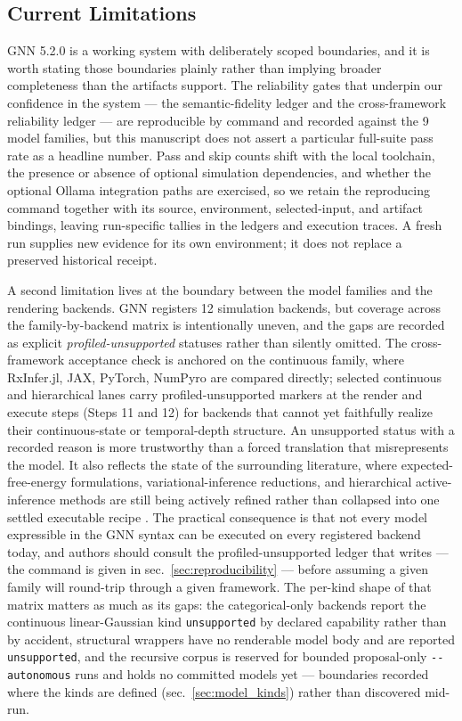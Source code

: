 \documentclass[
  english,
  9pt,
]{extarticle}
\begin{document}
\subsection{Current Limitations}\label{current-limitations}

GNN 5.2.0 is a working system with deliberately scoped boundaries, and
it is worth stating those boundaries plainly rather than implying
broader completeness than the artifacts support. The reliability gates
that underpin our confidence in the system --- the semantic-fidelity
ledger and the cross-framework reliability ledger --- are reproducible
by command and recorded against the 9 model families, but this
manuscript does not assert a particular full-suite pass rate as a
headline number. Pass and skip counts shift with the local toolchain,
the presence or absence of optional simulation dependencies, and whether
the optional Ollama integration paths are exercised, so we retain the
reproducing command together with its source, environment,
selected-input, and artifact bindings, leaving run-specific tallies in
the ledgers and execution traces. A fresh run supplies new evidence for
its own environment; it does not replace a preserved historical receipt.

A second limitation lives at the boundary between the model families and
the rendering backends. GNN registers 12 simulation backends, but
coverage across the family-by-backend matrix is intentionally uneven,
and the gaps are recorded as explicit \emph{profiled-unsupported}
statuses rather than silently omitted. The cross-framework acceptance
check is anchored on the continuous family, where RxInfer.jl, JAX,
PyTorch, NumPyro are compared directly; selected continuous and
hierarchical lanes carry profiled-unsupported markers at the render and
execute steps (Steps 11 and 12) for backends that cannot yet faithfully
realize their continuous-state or temporal-depth structure. An
unsupported status with a recorded reason is more trustworthy than a
forced translation that misrepresents the model. It also reflects the
state of the surrounding literature, where expected-free-energy
formulations, variational-inference reductions, and hierarchical
active-inference methods are still being actively refined rather than
collapsed into one settled executable recipe
\citep{champion2024reframingEfe, nuijten2026typeInference, rangarajan2026hierarchicalSuccessor}.
The practical consequence is that not every model expressible in the GNN
syntax can be executed on every registered backend today, and authors
should consult the profiled-unsupported ledger that
 writes --- the
command is given in sec.~\ref{sec:reproducibility} --- before assuming a
given family will round-trip through a given framework. The per-kind
shape of that matrix matters as much as its gaps: the categorical-only
backends report the continuous linear-Gaussian kind \texttt{unsupported}
by declared capability rather than by accident, structural wrappers have
no renderable model body and are reported \texttt{unsupported}, and the
recursive corpus is reserved for bounded proposal-only
\texttt{-\/-autonomous} runs and holds no committed models yet ---
boundaries recorded where the kinds are defined
(sec.~\ref{sec:model_kinds}) rather than discovered mid-run.
\end{document}

